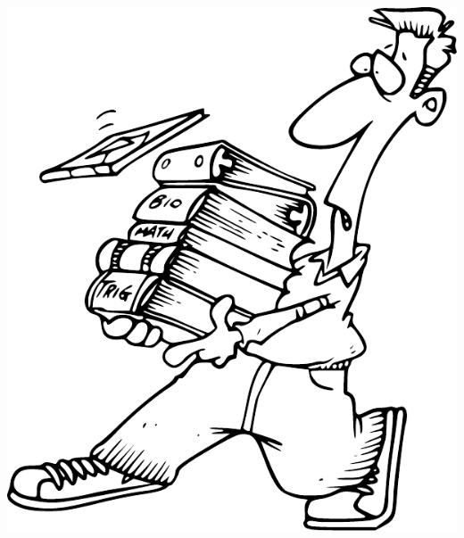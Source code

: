 \documentclass[11pt,french,english,twoside]{book}
\begin{document}






\cleardoublepage



\begin{center}
\includegraphics[width=0.4\columnwidth]{Figures/Bibliography}
\par\end{center}



\cleardoublepage

\printindex
\printindex[DL]
\printindex[PL]
\end{document}
